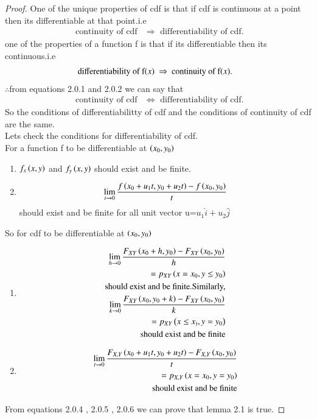 \documentclass[journal,12pt,twocolumn]{IEEEtran}
\begin{document}
\begin{proof}
One of the unique properties of cdf is that if cdf is continuous at a point then its differentiable at that point.i.e
\begin{align}
\text{ continuity of cdf} &\Rightarrow \text{ differentiability of cdf}.
\end{align}
one of the properties of a function f is that if its differentiable then its continuous.i.e
\begin{align}
\text{ differentiability of f\ensuremath{\left(x\right)} }  &\Rightarrow \text{ continuity of f\ensuremath{\left(x\right)}}.
\end{align}
$\therefore $from equations 2.0.1 and 2.0.2 we can say that 
\begin{align}
\text{ continuity of cdf} &\Leftrightarrow \text{ differentiability of cdf}.
\end{align}
So the conditions of differentiabilitty of cdf and the conditions of continuity of cdf are the same.\\
Lets check the conditions for differentiability of cdf.\\
For a function f to be differentiable at $\left(x_0,y_0\right)$
\begin{enumerate}
\item $f_x\left(x,y\right)$ and $f_y\left(x,y\right)$ should exist and be finite.
\item $$\lim_{t \rightarrow 0} \frac{f\left(x_0+u_1 t,y_0 + u_2 t\right)-f\left(x_0,y_0\right)}{t}$$ should exist and be finite for all unit vector u=$u_1 \hat{i} + u_2 \hat{j}$
\end{enumerate}
So for cdf to be differentiable at $\left(x_0,y_0\right)$
\begin{enumerate}
\item 
\begin{align}
\lim_{h \rightarrow 0} \frac{F_{XY}\left(x_0+h,y_0\right)-F_{XY}\left(x_0,y_0\right)}{h}\nonumber \\
= p_{XY}\left(x=x_0,y \leq y_0\right)\nonumber \\
\text{should exist and be finite.Similarly,} \\
\lim_{k \rightarrow 0} \frac{F_{XY}\left(x_0,y_0+k\right)-F_{XY}\left(x_0,y_0\right)}{k}\nonumber \\
=p_{XY}\left(x \leq x_),y=y_0\right)\nonumber \\
 \text{should exist and be finite}
\end{align}
\item 
\begin{align}
\lim_{t \rightarrow 0} \frac{F_{X,Y}\left(x_0+u_1 t,y_0 + u_2 t\right)-F_{X,Y}\left(x_0,y_0\right)}{t} \nonumber \\
=p_{X,Y}\left(x=x_0,y=y_0\right) \nonumber \\
 \text{ should exist and be finite}
\end{align}
\end{enumerate}
From equations 2.0.4 , 2.0.5 , 2.0.6 we can prove that lemma 2.1 is true.
\end{proof}
\end{document}
